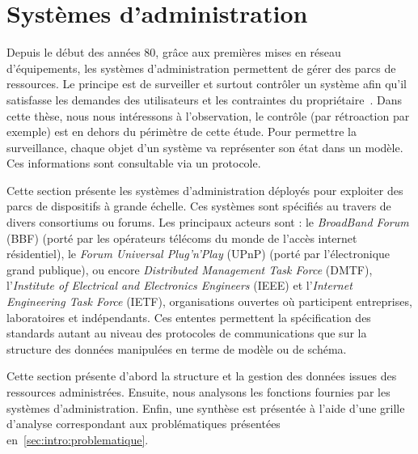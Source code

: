 \section{Systèmes d'administration}\label{sec:rw:supervision:administration}
Depuis le début des années 80, grâce aux premières mises en réseau d'équipements, les systèmes d'administration permettent de gérer des parcs de ressources. Le principe est de surveiller et surtout contrôler un système afin qu'il satisfasse les demandes des utilisateurs et les contraintes du propriétaire~\cite{Sloman:management}. Dans cette thèse, nous nous intéressons à l'observation, le contrôle (par rétroaction par exemple) est en dehors du périmètre de cette étude. Pour permettre la surveillance, chaque objet d'un système va représenter son état dans un modèle. Ces informations sont consultable via un protocole.

Cette section présente les systèmes d'administration déployés pour exploiter des parcs de dispositifs à grande échelle. Ces systèmes sont spécifiés au travers de divers consortiums ou forums. Les principaux acteurs sont : le \textit{BroadBand Forum} (BBF) (porté par les opérateurs télécoms du monde de l'accès internet résidentiel), le \textit{Forum Universal Plug'n'Play} (UPnP) (porté par l'électronique grand publique), ou encore \textit{Distributed Management Task Force} (DMTF), l'\textit{Institute of Electrical and Electronics Engineers} (IEEE) et l'\textit{Internet Engineering Task Force} (IETF), organisations ouvertes où participent entreprises, laboratoires et indépendants. Ces ententes permettent la spécification des standards autant au niveau des protocoles de communications que sur la structure des données manipulées en terme de modèle ou de schéma.

Cette section présente d'abord la structure et la gestion des données issues des ressources administrées. Ensuite, nous analysons les fonctions fournies par les systèmes d'administration. Enfin, une synthèse est présentée à l'aide d'une grille d'analyse correspondant aux problématiques présentées en~\ref{sec:intro:problematique}.
